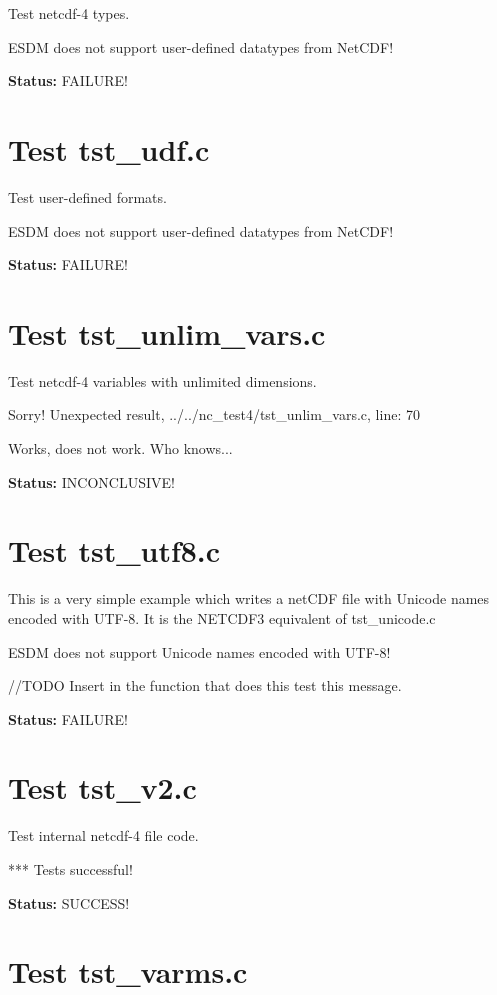 Test netcdf-4 types.

ESDM does not support user-defined datatypes from NetCDF!

{\bf \large Status: } FAILURE!

\section{Test tst\_udf.c}

Test user-defined formats.

ESDM does not support user-defined datatypes from NetCDF!

{\bf \large Status: } FAILURE!

\section{Test tst\_unlim\_vars.c}

Test netcdf-4 variables with unlimited dimensions.

Sorry! Unexpected result, ../../nc\_test4/tst\_unlim\_vars.c, line: 70

Works, does not work. Who knows...

{\bf \large Status: } INCONCLUSIVE!

\section{Test tst\_utf8.c}

This is a very simple example which writes a netCDF file with Unicode names encoded with UTF-8. It is the NETCDF3 equivalent of tst\_unicode.c

ESDM does not support Unicode names encoded with UTF-8!

//TODO Insert in the function that does this test this message.

{\bf \large Status: } FAILURE!

\section{Test tst\_v2.c}

Test internal netcdf-4 file code.

*** Tests successful!

{\bf \large Status: } SUCCESS!

\section{Test tst\_varms.c}

